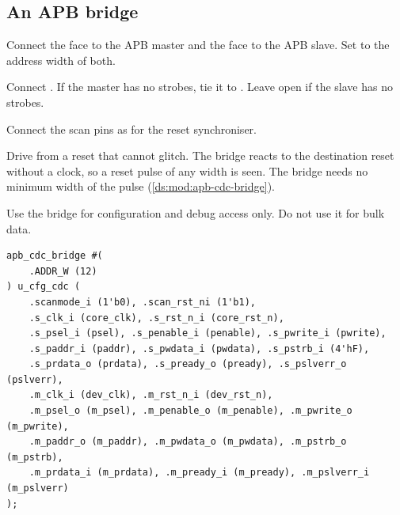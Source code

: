 \subsection{An APB bridge}
\begin{procedure}
  \item Connect the  face to the APB master and the  face to the APB slave. Set  to the address width of both.
  \item Connect . If the master has no strobes, tie it to . Leave  open if the slave has no strobes.
  \item Connect the scan pins as for the reset synchroniser.
  \item Drive  from a reset that cannot glitch. The bridge reacts to the destination reset without a clock, so a reset pulse of any width is seen. The bridge needs no minimum width of the pulse (\cref{ds:mod:apb-cdc-bridge}).
  \item Use the bridge for configuration and debug access only. Do not use it for bulk data.
\end{procedure}
\begin{lstlisting}
apb_cdc_bridge #(
    .ADDR_W (12)
) u_cfg_cdc (
    .scanmode_i (1'b0), .scan_rst_ni (1'b1),
    .s_clk_i (core_clk), .s_rst_n_i (core_rst_n),
    .s_psel_i (psel), .s_penable_i (penable), .s_pwrite_i (pwrite),
    .s_paddr_i (paddr), .s_pwdata_i (pwdata), .s_pstrb_i (4'hF),
    .s_prdata_o (prdata), .s_pready_o (pready), .s_pslverr_o (pslverr),
    .m_clk_i (dev_clk), .m_rst_n_i (dev_rst_n),
    .m_psel_o (m_psel), .m_penable_o (m_penable), .m_pwrite_o (m_pwrite),
    .m_paddr_o (m_paddr), .m_pwdata_o (m_pwdata), .m_pstrb_o (m_pstrb),
    .m_prdata_i (m_prdata), .m_pready_i (m_pready), .m_pslverr_i (m_pslverr)
);
\end{lstlisting}

